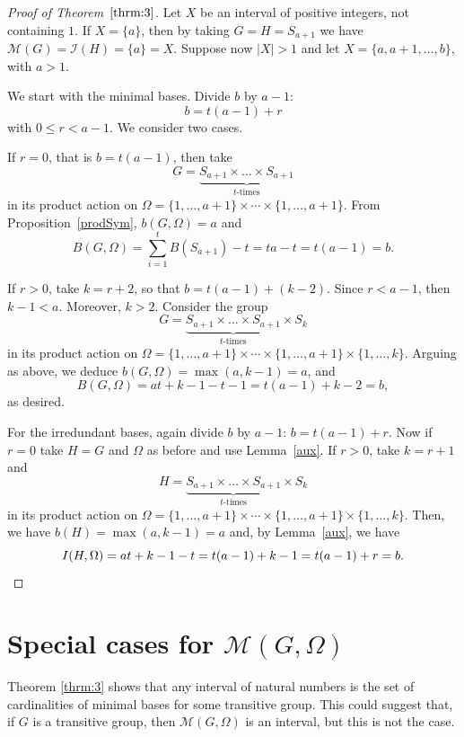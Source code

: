\documentclass{amsart}
\begin{document}
	\begin{proof}[Proof of Theorem~$\ref{thrm:3}$]Let $X$ be an interval of positive integers, not containing $1$.
		If $X = \{a\}$, then by taking $G = H = S_{a+1}$ we have $\mathcal{M}(G)=\mathcal{I}(H)=\{a\}=X$. Suppose now $|X|>1$ and let  $X = \{a,a+1,\dots,b\}$, with $a>1$.
		
		
		We start with the minimal bases. Divide $b$ by $a-1$: 
		\[
			b=t(a-1)+r
		\]
		with $0 \leq r < a-1$. We consider two cases.
		
		If $r=0$, that is $b=t(a-1)$, then take 
		\[
			G = \underbrace{S_{a+1} \times \dots \times S_{a+1}}_{t\text{-times}}
		\]
in its product action on $\Omega=\{1,\ldots,a+1\}\times\cdots \times\{1,\ldots,a+1\}$.
		From Proposition~\ref{prodSym}, $b(G,\Omega) = a$ and 
		\[
			B(G,\Omega) = \sum_{i=1}^{t}B(S_{a+1}) -t= ta -t = t(a-1) = b. 
		\]
		
		If $r>0$, take $k=r+2$, so that $b=t(a-1)+(k-2)$. Since $r<a-1$, then $k-1 < a$. Moreover, $k>2$. Consider the group
		\[
			G=\underbrace{S_{a+1} \times \dots \times S_{a+1}}_{t\text{-times}} \times S_{k}
		\]
in its product action on $\Omega=\{1,\ldots,a+1\}\times\cdots \times\{1,\ldots,a+1\}\times\{1,\ldots,k\}$. Arguing as above, we deduce $b(G,\Omega) = \max(a,k-1) = a$, and 
		\[
			B(G,\Omega) = at+k-1-t-1 = t(a-1) + k-2 = b,
		\]
		as desired.
		
		For the irredundant bases, again divide $b$ by $a-1$: $b=t(a-1)+r$. Now if $r=0$ take $H=G$ and $\Omega$ as before and use Lemma~\ref{aux}. If $r>0$, take $k=r+1$ and
		\[
			H=\underbrace{S_{a+1} \times \dots \times S_{a+1}}_{t\text{-times}} \times S_{k}
		\]
in its product action on $\Omega=\{1,\ldots,a+1\}\times\cdots \times\{1,\ldots,a+1\}\times\{1,\ldots,k\}$.
		Then, we have $b(H) = \max(a,k-1) = a$ and, by Lemma~\ref{aux}, we have
		\[
			I(H,\Omega) = at + k-1 - t = t(a-1) + k-1 = t(a-1)+r = b.\qedhere
		\]
	\end{proof}
	\section{Special cases for $\mathcal{M}(G,\Omega)$}\label{SpecCase}
	
	
	Theorem \ref{thrm:3} shows that any interval of natural numbers is the set of cardinalities of minimal bases for some transitive group. This could suggest that, if $G$ is a transitive group, then $\mathcal{M}(G,\Omega)$ is an interval, but this is not the case. 
	
\end{document}
